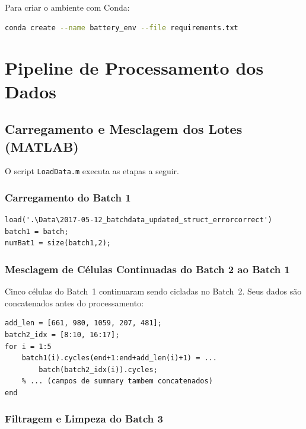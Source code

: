 \documentclass[12pt,a4paper]{article}
\begin{document}
Para criar o ambiente com Conda:
\begin{lstlisting}[language=bash, numbers=none, caption={Cria\c{c}\~ao do ambiente conda}]
conda create --name battery_env --file requirements.txt
\end{lstlisting}

\section{Pipeline de Processamento dos Dados}

\subsection{Carregamento e Mesclagem dos Lotes (MATLAB)}

O script \texttt{LoadData.m} executa as etapas a seguir.

\subsubsection{Carregamento do Batch 1}

\begin{lstlisting}[style=matlab, caption={Carregamento do primeiro lote}]
load('.\Data\2017-05-12_batchdata_updated_struct_errorcorrect')
batch1 = batch;
numBat1 = size(batch1,2);
\end{lstlisting}

\subsubsection{Mesclagem de C\'{e}lulas Continuadas do Batch 2 ao Batch 1}

Cinco c\'{e}lulas do Batch~1 continuaram sendo cicladas no Batch~2. Seus dados
s\~ao concatenados antes do processamento:

\begin{lstlisting}[style=matlab, caption={Concatena\c{c}\~ao de ciclos entre lotes}]
add_len = [661, 980, 1059, 207, 481];
batch2_idx = [8:10, 16:17];
for i = 1:5
    batch1(i).cycles(end+1:end+add_len(i)+1) = ...
        batch(batch2_idx(i)).cycles;
    % ... (campos de summary tambem concatenados)
end
\end{lstlisting}

\subsubsection{Filtragem e Limpeza do Batch 3}
\end{document}
